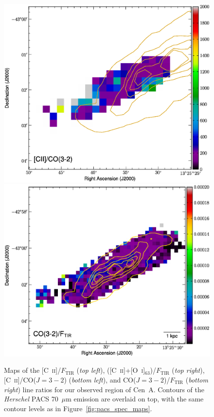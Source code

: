 \documentclass[preprint2]{aastex}
\begin{document}
\begin{figure}
\includegraphics[width=\columnwidth]{CenA_CIIonCO3-2_image}
\includegraphics[width=\columnwidth]{CenA_CO3-2onFtir_image_v1}
\caption{Maps of the [C~\textsc{ii}]/$F_{\mathrm{TIR}}$ (\emph{top left}), ([C~\textsc{ii}]+[O~\textsc{i}]$_{63}$)/$F_{\mathrm{TIR}}$ (\emph{top right}), [C~\textsc{ii}]/CO($J=3-2$) (\emph{bottom left}), and CO($J=3-2$)/$F_{\mathrm{TIR}}$ (\emph{bottom right}) line ratios for our observed region of Cen~A.  Contours of the \emph{Herschel} PACS 70~$\mu$m emission are overlaid on top, with the same contour levels as in Figure~\ref{fig:pacs_spec_maps}.}
\label{fig:cena_ratios}
\end{figure}
\end{document}
